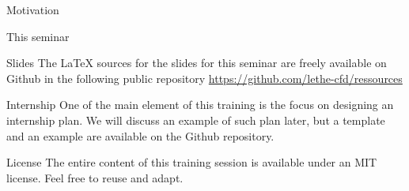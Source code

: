 \documentclass[t, 11pt,xcolor=dvipsnames]{beamer}
\begin{document}
\begin{frame} {Motivation}



\end{frame}

\begin{frame} {This seminar}
\begin{block}{Slides}
	The LaTeX sources for the slides for this seminar are freely available on Github in the following public repository \url{https://github.com/lethe-cfd/ressources}	
\end{block}

\begin{block}{Internship}
One of the main element of this training is the focus on designing an internship plan. We will discuss an example of such plan later, but a template and an example are available on the Github repository.
\end{block}

\begin{block}{License}
The entire content of this training session is available under an MIT license. Feel free to reuse and adapt.
\end{block}

\end{frame}
\end{document}
